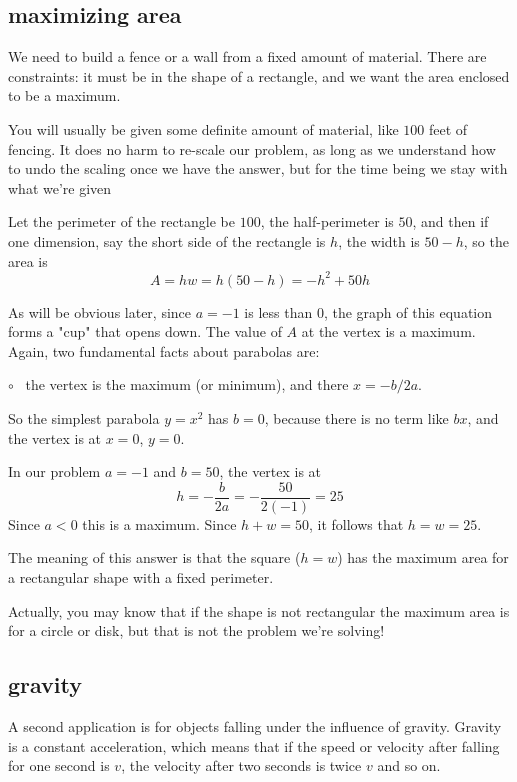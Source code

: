 \documentclass[11pt, oneside]{article}
\begin{document}
\subsection*{maximizing area}
We need to build a fence or a wall from a fixed amount of material.  There are constraints:   it must be in the shape of a rectangle, and we want the area enclosed to be a maximum.

You will usually be given some definite amount of material, like $100$ feet of fencing.  It does no harm to re-scale our problem, as long as we understand how to undo the scaling once we have the answer, but for the time being we stay with what we're given

Let the perimeter of the rectangle be $100$, the half-perimeter is $50$, and then if one dimension, say the short side of the rectangle is $h$, the width is $50 - h$, so the area is
\[ A = hw = h(50 - h) = -h^2 + 50h \]

As will be obvious later, since $a = - 1$ is less than $0$, the graph of this equation forms a "cup" that opens down.  The value of $A$ at the vertex is a maximum.  Again, two fundamental facts about parabolas are:   

$\circ$ \ the vertex is the maximum (or minimum), and there $x = -b/2a$.

So the simplest parabola $y = x^2$ has $b = 0$, because there is no term like $bx$, and the vertex is at $x = 0$, $y = 0$.

In our problem $a = -1$ and $b = 50$, the vertex is at
\[ h = - \frac{b}{2a} = - \frac{50}{2(-1)} = 25 \]
Since $a < 0$ this is a maximum.   Since $h + w = 50$, it follows that $h = w = 25$.

The meaning of this answer is that the square ($h = w$) has the maximum area for a rectangular shape with a fixed perimeter.

Actually, you may know that if the shape is not rectangular the maximum area is for a circle or disk, but that is not the problem we're solving!

\subsection*{gravity}

A second application is for objects falling under the influence of gravity.  Gravity is a constant acceleration, which means that if the speed or velocity after falling for one second is $v$, the velocity after two seconds is twice $v$ and so on.  
\end{document}
